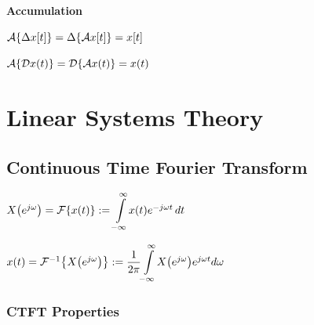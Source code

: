 \documentclass[11pt]{article}
\begin{document}
  \textbf{Accumulation}

  \(\mathcal{A}{\left\{ \Delta x[t] \right\}} = \Delta{\left\{ \mathcal{A} x[t] \right\}} = x[t]\)

  \(\mathcal{A}{\left\{ \mathcal{D} x(t) \right\}} = \mathcal{D}{\left\{ \mathcal{A} x(t) \right\}} = x(t)\)

  \pagebreak

  \section{Linear Systems Theory}

  \subsection{Continuous Time Fourier Transform}

  \begin{multicols}{2}
    \(X{\left( e^{j\omega} \right)} = \mathcal{F}{\left\{ x(t) \right\}} := \displaystyle{\int\limits_{-\infty}^{\infty}} \textstyle x(t)e^{-j\omega t}\, dt\)

    \columnbreak

    \(x(t) = \mathcal{F}^{-1}{\left\{ X{\left( e^{j\omega} \right)} \right\}} := \dfrac{1}{2\pi}\displaystyle{\int\limits_{-\infty}^{\infty}} \textstyle X{\left( e^{j\omega} \right)}e^{j\omega t} d\omega\)
  \end{multicols}

  \subsubsection{CTFT Properties}
\end{document}

